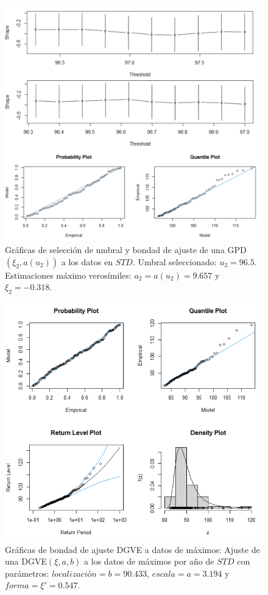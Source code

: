 \documentclass[10.5pt,notitlepage]{article}
\theoremstyle{plain}
\begin{document}
\begin{figure}[htb]
    \centering
    \includegraphics[scale = 0.4]{Incisob/AP2.png}
    \caption{Gráficas de selección de umbral y bondad de ajuste de una GPD\((\xi_2,a(u_2))\) a los datos en \(STD\). Umbral seleccionado: \(u_2 = 96.5\). Estimaciones máximo verosímiles: \(a_2 =a(u_2) = 9.657 \) y \(\xi_2 =-0.318\).}
    \label{fig:12}
\end{figure}

\begin{figure}[htb]
    \centering
    \includegraphics[scale = 0.4]{Incisob/gevfitSTD.png}
    \caption{Gráficas de bondad de ajuste DGVE a datos de máximos: Ajuste de una DGVE\((\xi,a,b)\) a los datos de máximos por año de \(STD\) con parámetros: \(localización=b = 90.433\), \(escala =a = 3.194\) y \(forma = \xi'=  0.547\).}
    \label{fig:14.1}   
\end{figure}     
\end{document}

